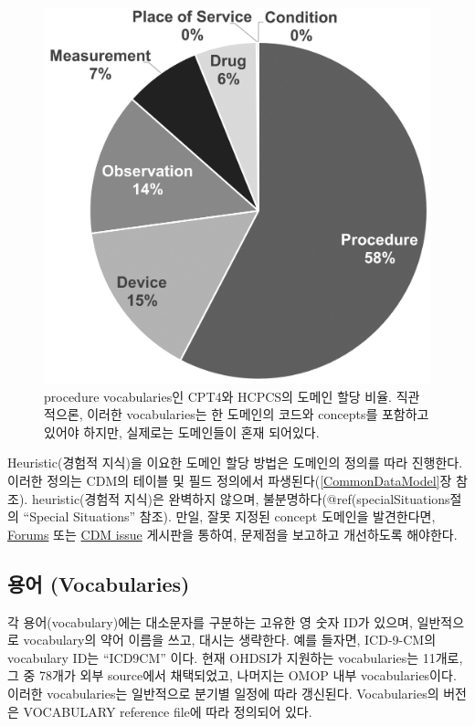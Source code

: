 \documentclass[11pt]{book}
\theoremstyle{definition}
\theoremstyle{definition}
\theoremstyle{definition}
\theoremstyle{remark}
\begin{document}
\begin{figure}

{\centering \includegraphics[width=0.7\linewidth]{images/StandardizedVocabularies/domains} 

}

\caption{procedure vocabularies인 CPT4와 HCPCS의 도메인 할당 비율. 직관적으론, 이러한 vocabularies는 한 도메인의 코드와 concepts를 포함하고있어야 하지만, 실제로는 도메인들이 혼재 되어있다.}\label{fig:domains}
\end{figure}

Heuristic(경험적 지식)을 이요한 도메인 할당 방법은 도메인의 정의를 따라
진행한다. 이러한 정의는 CDM의 테이블 및 필드 정의에서
파생된다(\ref{CommonDataModel}장 참조). heuristic(경험적 지식)은
완벽하지 않으며, 불분명하다(@ref(specialSituations절의 ``Special
Situations'' 참조). 만일, 잘못 지정된 concept 도메인을 발견한다면,
\href{https://forums.ohdsi.org}{Forums} 또는
\href{https://github.com/OHDSI/CommonDataModel/issues}{CDM issue}
게시판을 통하여, 문제점을 보고하고 개선하도록 해야한다.

\subsection{용어 (Vocabularies)}\label{-vocabularies}

각 용어(vocabulary)에는 대소문자를 구분하는 고유한 영 숫자 ID가 있으며,
일반적으로 vocabulary의 약어 이름을 쓰고, 대시는 생략한다. 예를 들자면,
ICD-9-CM의 vocabulary ID는 ``ICD9CM'' 이다. 현재 OHDSI가 지원하는
vocabularies는 11개로, 그 중 78개가 외부 source에서 채택되었고, 나머지는
OMOP 내부 vocabularies이다. 이러한 vocabularies는 일반적으로 분기별
일정에 따라 갱신된다. Vocabularies의 버전은 VOCABULARY reference file에
따라 정의되어 있다. 
\end{document}

